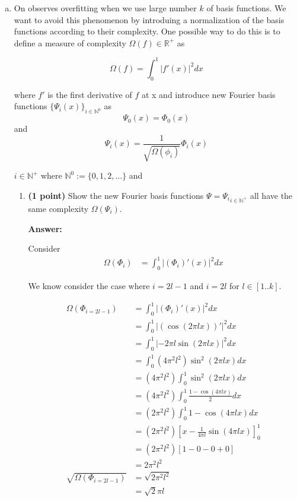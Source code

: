 \documentclass{./tufte-handout}
\begin{document}
\begin{enumerate}[(a)]
\begin{enumerate}
\end{enumerate}
\FloatBarrier
\item On observes overfitting when we use large number $k$ of basis functions. We 
want to avoid this phenomenon by introduing a normalization of the basis functions according 
to their complexity. One possible way to do this is to define a measure of complexity $\Omega(f) \in \mathbb{R}^+$ as

\begin{equation}
    \Omega(f) = \int_0^1 |f'(x)|^2  dx
\end{equation}

where $f'$ is the first derivative of $f$ at x and introduce new Fourier basis functions $\{\Psi_i(x)\}_{i \in \mathbb{N}^0}$ as
\begin{equation}
    \Psi_0(x) = \Phi_0(x) 
\end{equation} 
and 
\begin{equation}
    \Psi_i(x) = \frac{1}{\sqrt{\Omega(\phi_i)}} \Phi_i(x) 
\end{equation}

$i \in \mathbb{N}^+$ where $\mathbb{N}^0 :=\{0, 1,2, \dots \}$ and 
\begin{enumerate}
    \item \textbf{(1 point)} Show the new Fourier basis functions $\Psi = {\Psi_i}_{ i\in \mathbb{N}^+}$ all have the same 
    complexity $\Omega(\Psi_i)$. 

    \textbf{Answer:}

    Consider 
    \begin{align} 
        \Omega(\Phi_i) &= \int_0^1 |(\Phi_i)'(x)|^2 dx
    \end{align}

    We know consider the case where $i=2l-1$ and $i=2l$ for $l \in [1..k]$. 

    \begin{align}
        \Omega(\Phi_{i=2l-1}) &= \int_0^1 |(\Phi_i)'(x)|^2 dx \\
            &= \int_0^1 | (\cos(2 \pi l x ))' |^2 dx \\
            &= \int_0^1 | -2 \pi l \sin(2 \pi l x) |^2 dx \\
            &= \int_0^1 (4 \pi^2 l^2) \sin^2(2 \pi l x) dx \\
            &= (4 \pi^2 l^2) \int_0^1  \sin^2(2 \pi l x) dx \\
            &= (4 \pi^2 l^2) \int_0^1  \frac{1 - \cos(4 \pi l x)}{2} dx \\
            &= (2 \pi^2 l^2) \int_0^1  1 - \cos(4 \pi l x) dx \\
            &= (2 \pi^2 l^2) \left[ x - \frac{1}{4 \pi l} \sin(4 \pi l x) \right]_0^1 \\
            &= (2 \pi^2 l^2) \left[ 1 - 0 - 0 + 0 \right] \\
            &= 2 \pi^2 l^2\\
        \sqrt{\Omega(\Phi_{i=2l-1})} &= \sqrt{2 \pi^2 l^2} \\
            &= \sqrt{2} \pi l
    \end{align}


\end{enumerate}
\end{enumerate}
\end{document}
